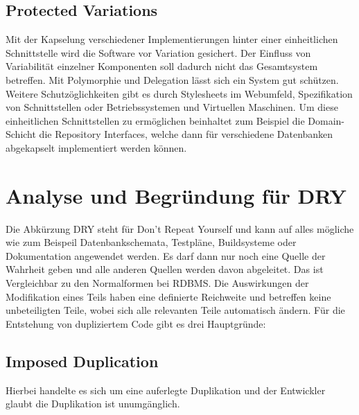 \subsection{Protected Variations}
Mit der Kapselung verschiedener Implementierungen hinter einer einheitlichen Schnittstelle wird die Software vor Variation gesichert.
Der Einfluss von Variabilität einzelner Komponenten soll dadurch nicht das Gesamtsystem betreffen.
Mit Polymorphie und Delegation lässt sich ein System gut schützen.
Weitere Schutzöglichkeiten gibt es durch Stylesheets im Webumfeld, Spezifikation von Schnittstellen oder Betriebssystemen und Virtuellen Maschinen.
Um diese einheitlichen Schnittstellen zu ermöglichen beinhaltet zum Beispiel die Domain-Schicht die Repository Interfaces, welche dann für verschiedene Datenbanken abgekapselt implementiert werden können.
\section{Analyse und Begründung für DRY}
Die Abkürzung DRY steht für Don’t Repeat Yourself und kann auf alles mögliche wie zum Beispeil Datenbankschemata, Testpläne, Buildsysteme oder Dokumentation angewendet werden.
Es darf dann nur noch eine Quelle der Wahrheit geben und alle anderen Quellen werden davon abgeleitet.
Das ist Vergleichbar zu den Normalformen bei RDBMS.
Die Auswirkungen der Modifikation eines Teils haben eine definierte Reichweite und betreffen keine unbeteiligten Teile,
wobei sich alle relevanten Teile automatisch ändern.
Für die Entstehung von dupliziertem Code gibt es drei Hauptgründe:
\subsection{Imposed Duplication}
Hierbei handelte es sich um eine auferlegte Duplikation und der Entwickler glaubt die Duplikation ist unumgänglich.
